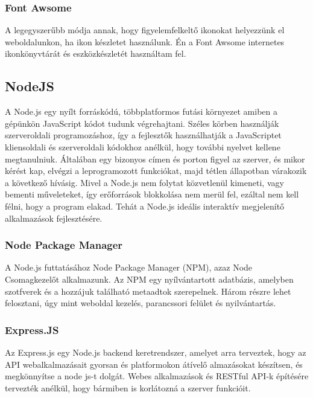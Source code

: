 \subsubsection{Font Awsome}

A legegyszerűbb módja annak, hogy figyelemfelkeltő ikonokat helyezzünk el weboldalunkon, ha ikon készletet használunk. Én a Font Awsome internetes ikonkönyvtárát és eszközkészletét használtam fel.

\subsection{NodeJS \cite{nodeJS}}

A Node.js egy nyílt forráskódú, többplatformos futási környezet amiben a gépünkön JavaScript kódot tudunk végrehajtani. Széles körben használják szerveroldali programozáshoz, így a fejlesztők használhatják a JavaScriptet kliensoldali és szerveroldali kódokhoz anélkül, hogy további nyelvet kellene megtanulniuk. Általában egy bizonyos címen és porton figyel az szerver, és mikor kérést kap, elvégzi a leprogramozott funkciókat, majd tétlen állapotban várakozik a következő hívásig. Mivel a Node.js nem folytat közvetlenül kimeneti, vagy bementi műveleteket, így erőforrások blokkolása nem merül fel, ezáltal nem kell félni, hogy a program elakad. Tehát a Node.js ideális interaktív megjelenítő alkalmazások fejlesztésére. \\

\subsubsection{Node Package Manager}

A Node.js futtatásához Node Package Manager (NPM), azaz Node Csomagkezelőt alkalmazunk. Az NPM egy nyílvántartott adatbázis, amelyben szotfverek és a hozzájuk található metaadtok szerepelnek. Három részre lehet felosztani, úgy mint weboldal kezelés, parancssori felület és nyilvántartás.

\subsubsection{Express.JS}

Az Express.js egy Node.js backend keretrendszer, amelyet arra terveztek, hogy az API webalkalmazásait gyorsan és platformokon átívelő almazásokat készítsen, és megkönnyítse a node js-t dolgát. Webes alkalmazások és RESTful API-k építésére tervezték anélkül, hogy bármiben is korlátozná a szerver funkcióit.

